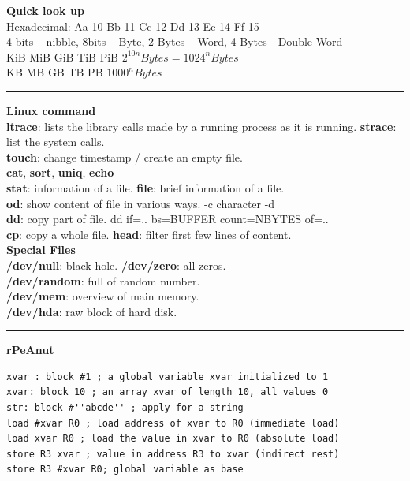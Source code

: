 \documentclass[8pt,a4paper,landscape]{article}
\newcommand{\topic}[1]{\textbf{\large #1}}
\begin{document}
\small
\begin{spacing}{-1}
\begin{multicols*}{3}
    \noindent
    \topic{Quick look up} \\
    Hexadecimal: Aa-10  Bb-11  Cc-12  Dd-13  Ee-14  Ff-15 \\
    4 bits – nibble, 8bits – Byte, 2 Bytes – Word, 4 Bytes - Double Word\\
    KiB MiB GiB TiB PiB $2^{10n} Bytes = 1024^{n} Bytes$\\
    KB MB GB TB PB  $1000^{n} Bytes$ \\
    \hrule \noindent
    \topic{Linux command} \\
    \textbf{ltrace}: lists the library calls made by a running process as it is running. 
    \textbf{strace}: list the system calls.  \\
    \textbf{touch}: change timestamp / create an empty file. \\
    \textbf{cat}, \textbf{sort}, \textbf{uniq}, \textbf{echo} \\
    \textbf{stat}: information of a file. \textbf{file}: brief information of a file.\\
    \textbf{od}: show content of file in various ways. -c character -d \\
    \textbf{dd}: copy part of file. dd if=.. bs=BUFFER count=NBYTES of=.. \\
    \textbf{cp}: copy a whole file. \textbf{head}: filter first few lines of content. \\
    \topic{Special Files} \\
    \textbf{/dev/null}: black hole. \textbf{/dev/zero}: all zeros. \\
    \textbf{/dev/random}: full of random number. \\
    \textbf{/dev/mem}: overview of main memory. \\
    \textbf{/dev/hda}: raw block of hard disk. \\
    \hrule \noindent
\vspace*{-2mm}
\topic{rPeAnut} \\
\begin{verbatim}
xvar : block #1 ; a global variable xvar initialized to 1
xvar: block 10 ; an array xvar of length 10, all values 0
str: block #''abcde'' ; apply for a string
load #xvar R0 ; load address of xvar to R0 (immediate load)
load xvar R0 ; load the value in xvar to R0 (absolute load)
store R3 xvar ; value in address R3 to xvar (indirect rest)
store R3 #xvar R0; global variable as base 

\end{verbatim}
\end{multicols*}
\end{spacing}
\end{document}
